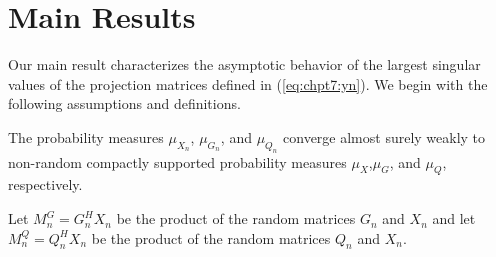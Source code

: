 \section{Main Results}\label{sec:chpt7:main_results}

Our main result characterizes the asymptotic behavior of the largest
singular values of the projection matrices defined in (\ref{eq:chpt7:yn}). We begin with
the following assumptions and definitions. 

\begin{Assum}\label{assum:x_limit}
The probability measures $\mu_{X_n}$, $\mu_{G_n}$, and $\mu_{Q_n}$ converge almost surely
weakly to non-random compactly supported probability measures $\mu_X$,$\mu_G$, and
$\mu_Q$, respectively.  
\end{Assum}

\begin{Def}
Let $M_n^G = G_n^HX_n$ be the product of the random matrices $G_n$ and $X_n$ and let
$M_n^Q=Q_n^HX_n$ be the product of the random matrices $Q_n$ and $X_n$.
\end{Def}

